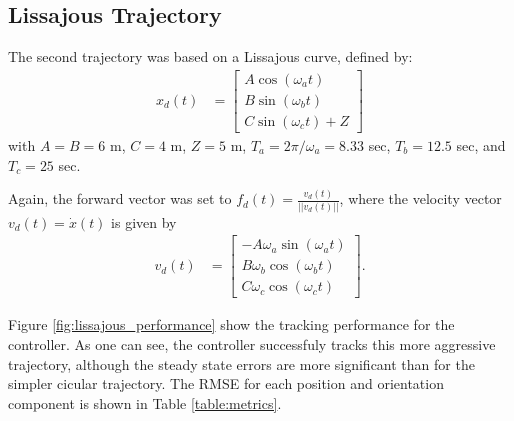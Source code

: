\documentclass[paper=letter, fontsize=11pt]{scrartcl} %
\numberwithin{equation}{section} %
\numberwithin{figure}{section} %
\numberwithin{table}{section} %
\begin{document}
\pagebreak
\subsection{Lissajous Trajectory}
The second trajectory was based on a Lissajous curve, defined by:
\begin{align}
  x_d(t) &=
  \begin{bmatrix}
    A \cos(\omega_a t) \\
    B \sin(\omega_b t) \\
    C \sin(\omega_c t) + Z
  \end{bmatrix}
\end{align}
with $A = B = 6$ m, $C = 4$ m, $Z = 5$ m, $T_a = 2 \pi/ \omega_a = 8.33$ sec,
$T_b = 12.5$ sec, and $T_c = 25$ sec.

Again, the forward vector was set to $f_d(t) = \frac{v_d(t)}{||v_d(t)||}$, where the
velocity vector $v_d(t) = \dot{x}(t)$ is given by
\begin{align}
  v_d(t) &=
  \begin{bmatrix}
    -A \omega_a \sin(\omega_a t) \\
    B \omega_b \cos(\omega_b t) \\
    C \omega_c \cos(\omega_c t)
  \end{bmatrix}.
\end{align}

Figure \ref{fig:lissajous_performance} show the tracking
performance for the controller. As one can see, the controller successfuly
tracks this more aggressive trajectory, although the steady state errors are
more significant than for the simpler cicular trajectory. The RMSE for each
position and orientation component is shown in Table \ref{table:metrics}.
\end{document}
